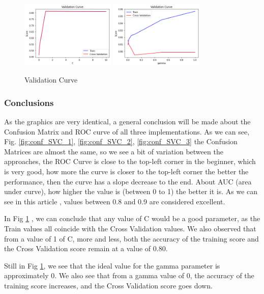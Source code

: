 \documentclass[conference]{IEEEtran}
\begin{document}
\begin{figure}[h!]
    \centering
    \includegraphics[width=4.5cm]{SVC/svc4_1.png}
    \includegraphics[width=4.5cm]{SVC/svc4_2.png}
    \caption{Validation Curve}
    \label{img:validationCurveSVC}
\end{figure}

\subsubsection{Conclusions}
As the graphics are very identical, a general conclusion will be made about the Confusion Matrix and ROC curve of all three implementations. As we can see, Fig. \ref{fig:conf_SVC_1}, \ref{fig:conf_SVC_2}, \ref{fig:conf_SVC_3} the Confusion Matrices are almost the same, so we see a bit of variation between the approaches, the ROC Curve is close to the top-left corner in the beginner, which is very good, how more the curve is closer to the top-left corner the better the performance, then the curve has a slope decrease to the end. About AUC (area under curve), how higher the value is (between 0 to 1) the better it is. As we can see in this article \cite{ROC_article}, values between 0.8 and 0.9 are considered excellent.

In Fig \ref{img:validationCurveSVC} , we can conclude that any value of C would be a good parameter, as the Train values all coincide with the Cross Validation values. We also observed that from a value of 1 of C, more and less, both the accuracy of the training score and the Cross Validation score remain at a value of 0.80.

Still in Fig \ref{img:validationCurveSVC}, we see that the ideal value for the gamma parameter is approximately 0. We also see that from a gamma value of 0, the accuracy of the training score increases, and the Cross Validation score goes down.
\end{document}
